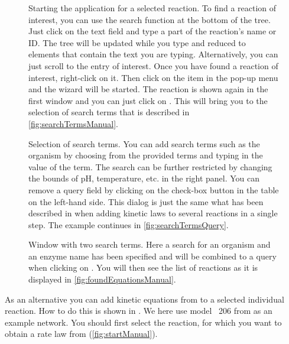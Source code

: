 \begin{figure}[t!]
\caption[Starting the \SABIO application for a selected reaction]{Starting the \SABIO application for a selected reaction.
To find a reaction of interest, you can use the search function at the bottom of the \SBML tree.
Just click on the text field and type a part of the reaction's name or \ac{ID}.
The tree will be updated while you type and reduced to elements that contain the text you are typing.
Alternatively, you can just scroll to the entry of interest.
Once you have found a reaction of interest, right-click on it.
Then click on the \SABIO item in the pop-up menu and the \SABIO wizard will be started.
The reaction is shown again in the first window and you can just click on .
This will bring you to the selection of search terms that is described in \vref{fig:searchTermsManual}.}
\label{fig:startManual}
\end{figure}
\begin{figure}
\caption[Selection of search terms]{Selection of search terms.
You can add search terms such as the organism by choosing from the provided terms and
typing in the value of the term. The search can be further restricted by changing the
bounds of pH, temperature, etc. in the right panel. 
You can remove a query field by clicking on the check-box button in the table on the left-hand side.
This dialog is just the same what has been described in  when adding kinetic laws to several reactions in a single step.
The example continues in \vref{fig:searchTermsQuery}.}
\label{fig:searchTermsManual}
\end{figure}
\begin{figure}
\caption[Window with two search terms]{Window with two search terms.
Here a search for an organism and an enzyme name has been specified and will be
combined to a query when clicking on .
You will then see the list of reactions as it is displayed in \vref{fig:foundEquationsManual}.}
\label{fig:searchTermsQuery}
\end{figure}
As an alternative you can add kinetic equations from \SABIO to a selected individual reaction.
How to do this is shown in .
We here use model \numero~206 from \BioModels \citep{Li2010a, Wolf2000} as an example network.
You should first select the reaction, for which you want to obtain a rate law from \SABIO (\vref{fig:startManual}).

